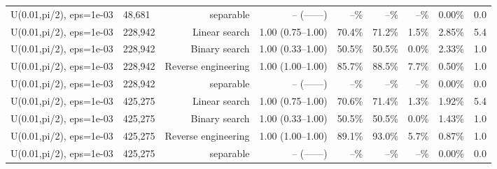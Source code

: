 \begin{tabular}{llrrrrrrr}
U(0.01,pi/2), eps=1e-03 & 48,681 & separable & -- (------) & --\% & --\% & --\% & 0.00\% & 0.0 \\
U(0.01,pi/2), eps=1e-03 & 228,942 & Linear search & 1.00 (0.75--1.00) & 70.4\% & 71.2\% & 1.5\% & 2.85\% & 5.4 \\
U(0.01,pi/2), eps=1e-03 & 228,942 & Binary search & 1.00 (0.33--1.00) & 50.5\% & 50.5\% & 0.0\% & 2.33\% & 1.0 \\
U(0.01,pi/2), eps=1e-03 & 228,942 & Reverse engineering & 1.00 (1.00--1.00) & 85.7\% & 88.5\% & 7.7\% & 0.50\% & 1.0 \\
U(0.01,pi/2), eps=1e-03 & 228,942 & separable & -- (------) & --\% & --\% & --\% & 0.00\% & 0.0 \\
U(0.01,pi/2), eps=1e-03 & 425,275 & Linear search & 1.00 (0.75--1.00) & 70.6\% & 71.4\% & 1.3\% & 1.92\% & 5.4 \\
U(0.01,pi/2), eps=1e-03 & 425,275 & Binary search & 1.00 (0.33--1.00) & 50.5\% & 50.5\% & 0.0\% & 1.43\% & 1.0 \\
U(0.01,pi/2), eps=1e-03 & 425,275 & Reverse engineering & 1.00 (1.00--1.00) & 89.1\% & 93.0\% & 5.7\% & 0.87\% & 1.0 \\
U(0.01,pi/2), eps=1e-03 & 425,275 & separable & -- (------) & --\% & --\% & --\% & 0.00\% & 0.0 \\
\bottomrule
\end{tabular}
